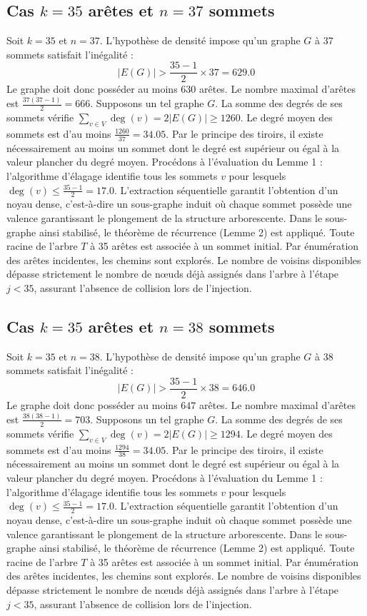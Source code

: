 \documentclass[12pt,a4paper]{article}
\begin{document}
\subsection{Cas $k = 35$ arêtes et $n = 37$ sommets}
Soit $k = 35$ et $n = 37$. L'hypothèse de densité impose qu'un graphe $G$ à 37 sommets satisfait l'inégalité :
$$ |E(G)| > \frac{35-1}{2} \times 37 = 629.0 $$
Le graphe doit donc posséder au moins $630$ arêtes. Le nombre maximal d'arêtes est $\frac{37(37-1)}{2} = 666$.
Supposons un tel graphe $G$. La somme des degrés de ses sommets vérifie $\sum_{v \in V} \deg(v) = 2|E(G)| \geq 1260$.
Le degré moyen des sommets est d'au moins $\frac{1260}{37} = 34.05$.
Par le principe des tiroirs, il existe nécessairement au moins un sommet dont le degré est supérieur ou égal à la valeur plancher du degré moyen.
Procédons à l'évaluation du Lemme 1 : l'algorithme d'élagage identifie tous les sommets $v$ pour lesquels $\deg(v) \leq \frac{35-1}{2} = 17.0$.
L'extraction séquentielle garantit l'obtention d'un noyau dense, c'est-à-dire un sous-graphe induit où chaque sommet possède une valence garantissant le plongement de la structure arborescente.
Dans le sous-graphe ainsi stabilisé, le théorème de récurrence (Lemme 2) est appliqué. Toute racine de l'arbre $T$ à 35 arêtes est associée à un sommet initial. Par énumération des arêtes incidentes, les chemins sont explorés. Le nombre de voisins disponibles dépasse strictement le nombre de nœuds déjà assignés dans l'arbre à l'étape $j < 35$, assurant l'absence de collision lors de l'injection.

\subsection{Cas $k = 35$ arêtes et $n = 38$ sommets}
Soit $k = 35$ et $n = 38$. L'hypothèse de densité impose qu'un graphe $G$ à 38 sommets satisfait l'inégalité :
$$ |E(G)| > \frac{35-1}{2} \times 38 = 646.0 $$
Le graphe doit donc posséder au moins $647$ arêtes. Le nombre maximal d'arêtes est $\frac{38(38-1)}{2} = 703$.
Supposons un tel graphe $G$. La somme des degrés de ses sommets vérifie $\sum_{v \in V} \deg(v) = 2|E(G)| \geq 1294$.
Le degré moyen des sommets est d'au moins $\frac{1294}{38} = 34.05$.
Par le principe des tiroirs, il existe nécessairement au moins un sommet dont le degré est supérieur ou égal à la valeur plancher du degré moyen.
Procédons à l'évaluation du Lemme 1 : l'algorithme d'élagage identifie tous les sommets $v$ pour lesquels $\deg(v) \leq \frac{35-1}{2} = 17.0$.
L'extraction séquentielle garantit l'obtention d'un noyau dense, c'est-à-dire un sous-graphe induit où chaque sommet possède une valence garantissant le plongement de la structure arborescente.
Dans le sous-graphe ainsi stabilisé, le théorème de récurrence (Lemme 2) est appliqué. Toute racine de l'arbre $T$ à 35 arêtes est associée à un sommet initial. Par énumération des arêtes incidentes, les chemins sont explorés. Le nombre de voisins disponibles dépasse strictement le nombre de nœuds déjà assignés dans l'arbre à l'étape $j < 35$, assurant l'absence de collision lors de l'injection.
\end{document}
